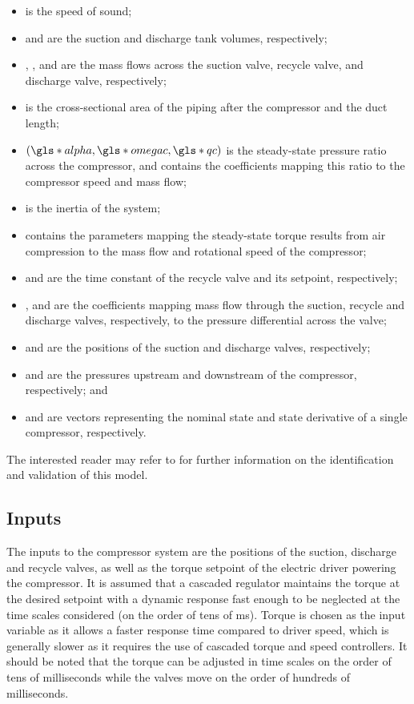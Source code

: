 \begin{itemize}[noitemsep]
  \item {} is the speed of sound;
  \item {} and  are the suction and discharge tank volumes, respectively;
  \item {}, , and  are the mass flows across the suction valve, recycle valve, and discharge valve, respectively;
  \item {} is the cross-sectional area of the piping after the compressor and  the duct length;
  \item {}$\left(\g{alpha},\g{omegac}, \g{qc} \right)$ is the steady-state pressure ratio across the compressor, and  contains the coefficients mapping this ratio to the compressor speed and mass flow;
  \item {} is the inertia of the system;
  \item {} contains the parameters mapping the steady-state torque results from air compression to the mass flow and rotational speed of the compressor;
  \item {} and  are the time constant of the recycle valve and its setpoint, respectively;
  \item {},  and  are the coefficients mapping mass flow through the suction, recycle and discharge valves, respectively, to the pressure differential across the valve;
  \item {} and  are the positions of the suction and discharge valves, respectively;
  \item {} and  are the pressures upstream and downstream of the compressor, respectively; and
  \item {} and  are vectors representing the nominal state and state derivative of a single compressor, respectively.
\end{itemize}

The interested reader may refer to \cite{Cortinovis2015} for further information on the identification and validation of this model.

\subsection{Inputs}

The inputs to the compressor system are the positions of the suction, discharge and recycle valves, as well as the torque setpoint of the electric driver powering the compressor.
It is assumed that a cascaded regulator maintains the torque at the desired setpoint with a dynamic response fast enough to be neglected at the time scales considered (on the order of tens of ms).
Torque is chosen as the input variable as it allows a faster response time compared to driver speed, which is generally slower as it requires the use of cascaded torque and speed controllers.
It should be noted that the torque can be adjusted in time scales on the order of tens of milliseconds while the valves move on the order of hundreds of milliseconds.

